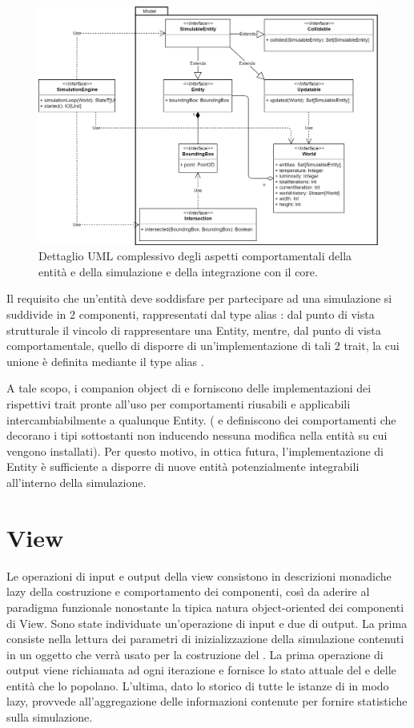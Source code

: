 \begin{figure}[h!]
\centering
\includegraphics[width=\textwidth, scale=0.14]{img/Model.png}
\caption{Dettaglio UML complessivo degli aspetti comportamentali della entità e della simulazione e della integrazione con il core. }
\label{fig:model}
\end{figure}

Il requisito che un’entità deve soddisfare per partecipare ad una simulazione si suddivide in 2 componenti, rappresentati dal type alias : dal punto di vista strutturale il vincolo di rappresentare una Entity, mentre, dal punto di vista comportamentale, quello di disporre di un’implementazione di tali 2 trait, la cui unione è definita mediante il type alias .

A tale scopo, i companion object di  e  forniscono delle implementazioni dei rispettivi trait pronte all’uso per comportamenti riusabili e applicabili intercambiabilmente a qualunque Entity. ( e  definiscono dei comportamenti che decorano i tipi sottostanti non inducendo nessuna modifica nella entità su cui vengono installati). Per questo motivo, in ottica futura, l’implementazione di Entity è sufficiente a disporre di nuove entità potenzialmente integrabili all’interno della simulazione.

\section{View}

Le operazioni di input e output della view consistono in descrizioni monadiche lazy della costruzione e comportamento dei componenti, così da aderire al paradigma funzionale nonostante la tipica natura object-oriented dei componenti di View. Sono state individuate un'operazione di input e due di output. La prima consiste nella lettura dei parametri di inizializzazione della simulazione contenuti in un oggetto  che verrà usato per la costruzione del . La prima operazione di output viene richiamata ad ogni iterazione e fornisce lo stato attuale del  e delle entità che lo popolano. L'ultima, dato lo storico di tutte le istanze di  in modo lazy, provvede all'aggregazione delle informazioni contenute per fornire statistiche sulla simulazione.


